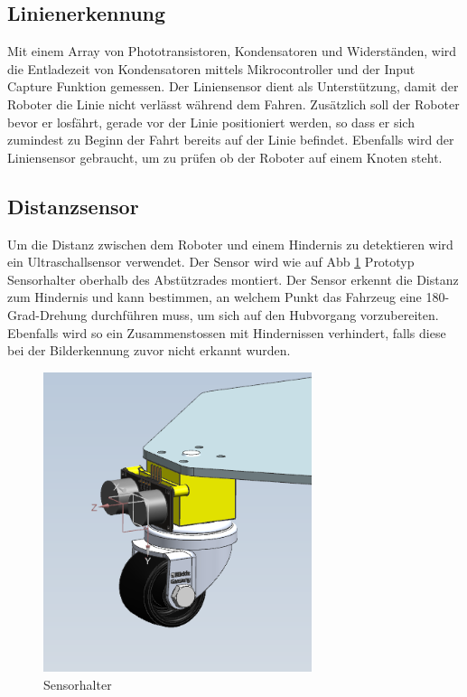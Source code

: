 \subsection{Linienerkennung}

Mit einem Array von Phototransistoren, Kondensatoren und Widerständen, wird die Entladezeit von Kondensatoren mittels Mikrocontroller und der Input Capture Funktion gemessen. Der Liniensensor dient als Unterstützung, damit der Roboter die Linie nicht verlässt während dem Fahren. Zusätzlich soll der Roboter bevor er losfährt, gerade vor der Linie positioniert werden, so dass er sich zumindest zu Beginn der Fahrt bereits auf der Linie befindet. Ebenfalls wird der Liniensensor gebraucht, um zu prüfen ob der Roboter auf einem Knoten steht.

\subsection{Distanzsensor}
\label{subsection:Distanzsensor}

Um die Distanz zwischen dem Roboter und einem Hindernis zu detektieren wird ein Ultraschallsensor verwendet. Der Sensor wird wie auf Abb \ref{fig:Prototype_Sensorhalter} Prototyp Sensorhalter oberhalb des Abstützrades montiert. Der Sensor erkennt die Distanz zum Hindernis und kann bestimmen, an welchem Punkt das Fahrzeug eine 180-Grad-Drehung durchführen muss, um sich auf den Hubvorgang vorzubereiten. Ebenfalls wird so ein Zusammenstossen mit Hindernissen verhindert, falls diese bei der Bilderkennung zuvor nicht erkannt wurden.

\begin{figure}[H]
\centering
\includegraphics[width=0.7\textwidth]{assets/prototyp-fahrwerk/Prototyp_Sensorhalter.png}
\caption{Sensorhalter}
\label{fig:Prototype_Sensorhalter}
\end{figure}



